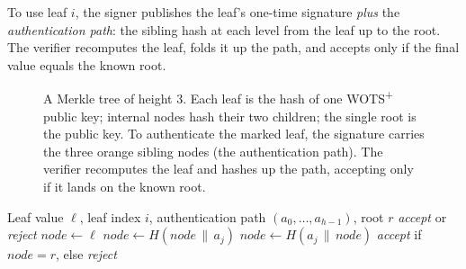 To use leaf $i$, the signer publishes the leaf's one-time signature \emph{plus} the \emph{authentication path}: the sibling hash at each level from the leaf up to the root. The verifier recomputes the leaf, folds it up the path, and accepts only if the final value equals the known root.

\begin{figure}[H]
\centering
{}
\caption{A Merkle tree of height $3$. Each leaf is the hash of one WOTS\textsuperscript{+} public key; internal nodes hash their two children; the single root is the public key. To authenticate the marked leaf, the signature carries the three orange sibling nodes (the authentication path). The verifier recomputes the leaf and hashes up the path, accepting only if it lands on the known root.}
\label{fig:merkle}
\end{figure}

\begin{algorithm}[H]
\caption{Verify a Merkle authentication path}
\label{alg:merkle-path}
\begin{algorithmic}[1]
\Require Leaf value $\ell$, leaf index $i$, authentication path $(a_0,\dots,a_{h-1})$, root $r$
\Ensure \emph{accept} or \emph{reject}
\State $node \gets \ell$
    \State $node \gets H(node \,\|\, a_j)$ 
  \Else
    \State $node \gets H(a_j \,\|\, node)$ 
  \EndIf
\EndFor
\State \Return \emph{accept} if $node = r$, else \emph{reject}
\end{algorithmic}
\end{algorithm}

